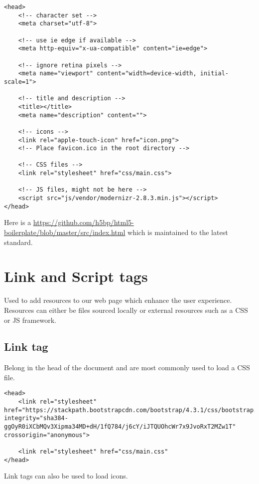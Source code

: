 \begin{verbatim}
<head>
    <!-- character set -->
    <meta charset="utf-8">

    <!-- use ie edge if available -->
    <meta http-equiv="x-ua-compatible" content="ie=edge">

    <!-- ignore retina pixels -->
    <meta name="viewport" content="width=device-width, initial-scale=1">

    <!-- title and description -->
    <title></title>
    <meta name="description" content="">

    <!-- icons -->
    <link rel="apple-touch-icon" href="icon.png">
    <!-- Place favicon.ico in the root directory -->

    <!-- CSS files -->
    <link rel="stylesheet" href="css/main.css">

    <!-- JS files, might not be here -->
    <script src="js/vendor/modernizr-2.8.3.min.js"></script>
</head>
\end{verbatim}

Here is a \href{link to the code for HTML5 Boilerplate}{https://github.com/h5bp/html5-boilerplate/blob/master/src/index.html} which is maintained to the latest standard.

\section{Link and Script tags}

Used to add resources to our web page which enhance the user experience. Resources can either be files sourced locally or external resources such as a CSS or JS framework.

\subsection{Link tag}

Belong in the head of the document and are most commonly used to load a CSS file.

\begin{verbatim}
<head>
    <link rel="stylesheet" href="https://stackpath.bootstrapcdn.com/bootstrap/4.3.1/css/bootstrap.min.css" integrity="sha384-ggOyR0iXCbMQv3Xipma34MD+dH/1fQ784/j6cY/iJTQUOhcWr7x9JvoRxT2MZw1T" crossorigin="anonymous">

    <link rel="stylesheet" href="css/main.css"
</head>
\end{verbatim}

Link tags can also be used to load icons.

